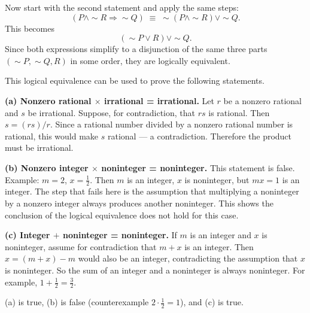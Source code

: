 \documentclass[11pt]{article}
\begin{document}
Now start with the second statement and apply the same steps:
\[
(P \wedge \sim R \Rightarrow \sim Q) \;\equiv\; \sim(P \wedge \sim R) \vee \sim Q.
\]
This becomes
\[
(\sim P \vee R) \vee \sim Q.
\]
Since both expressions simplify to a disjunction of the same three parts $(\sim P, \sim Q, R)$ in some order, they are logically equivalent.

\bigskip
\noindent This logical equivalence can be used to prove the following statements.

\medskip
\noindent\textbf{(a) Nonzero rational $\times$ irrational = irrational.}  
Let $r$ be a nonzero rational and $s$ be irrational.  
Suppose, for contradiction, that $rs$ is rational.  
Then $s = (rs)/r$. Since a rational number divided by a nonzero rational number is rational, this would make $s$ rational — a contradiction.  
Therefore the product must be irrational.

\medskip
\noindent\textbf{(b) Nonzero integer $\times$ noninteger = noninteger.}  
This statement is false.  
Example: $m=2$, $x=\tfrac{1}{2}$. Then $m$ is an integer, $x$ is noninteger, but $mx=1$ is an integer.  
The step that fails here is the assumption that multiplying a noninteger by a nonzero integer always produces another noninteger.  
This shows the conclusion of the logical equivalence does not hold for this case.

\medskip
\noindent\textbf{(c) Integer $+$ noninteger = noninteger.}  
If $m$ is an integer and $x$ is noninteger, assume for contradiction that $m+x$ is an integer.  
Then $x = (m+x) - m$ would also be an integer, contradicting the assumption that $x$ is noninteger.  
So the sum of an integer and a noninteger is always noninteger.  
For example, $1 + \tfrac{1}{2} = \tfrac{3}{2}$.

\bigskip

(a) is true, (b) is false (counterexample $2 \cdot \tfrac{1}{2} = 1$), and (c) is true.
\end{document}
